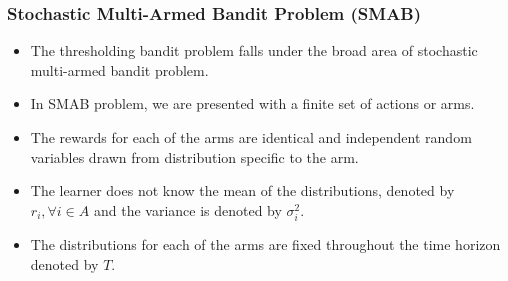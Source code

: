 \begin{frame}
\frametitle{Stochastic Multi-Armed Bandit Problem (SMAB)}
\begin{itemize}
\item<1-> The thresholding bandit problem falls under the broad area of stochastic multi-armed bandit problem.
\item<2-> In SMAB problem, we are presented with a finite set of actions or arms. 
\item<3-> The rewards for each of the arms are identical and independent random variables drawn from distribution specific to the arm.
\item<4-> The learner does not know the mean of the distributions, denoted by $r_{i},\forall i\in A$ and the variance is denoted by $\sigma_i^2$. 
\item<5-> The distributions for each of the arms are fixed throughout the time horizon denoted by $T$. 
\end{itemize}
\end{frame}


